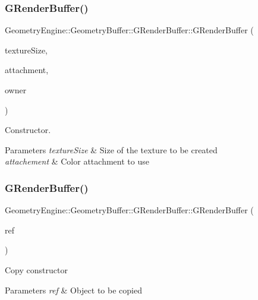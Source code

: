 \subsubsection{\texorpdfstring{GRenderBuffer()}{GRenderBuffer()}\hspace{0.1cm}{\footnotesize\ttfamily [2/3]}}
{\footnotesize\ttfamily Geometry\+Engine\+::\+Geometry\+Buffer\+::\+G\+Render\+Buffer\+::\+G\+Render\+Buffer (\begin{DoxyParamCaption}\item[{const Q\+Vector2D \&}]{texture\+Size,  }\item[{G\+Framebuffer\+Commons\+::\+G\+\_\+\+C\+O\+L\+O\+R\+\_\+\+A\+T\+T\+A\+C\+H\+M\+E\+N\+TS}]{attachment,  }\item[{const \mbox{\hyperlink{class_geometry_engine_1_1_geometry_buffer_1_1_g_framebuffer_object}{G\+Framebuffer\+Object}} $\ast$}]{owner }\end{DoxyParamCaption})}

Constructor. 
\begin{DoxyParams}{Parameters}
{\em texture\+Size} & Size of the texture to be created \\
\hline
{\em attachement} & Color attachment to use \\
\hline
\end{DoxyParams}
\mbox{\label{class_geometry_engine_1_1_geometry_buffer_1_1_g_render_buffer_ac2ea09ec4bd5f76a51f33978196aa6f8}} 
\subsubsection{\texorpdfstring{GRenderBuffer()}{GRenderBuffer()}\hspace{0.1cm}{\footnotesize\ttfamily [3/3]}}
{\footnotesize\ttfamily Geometry\+Engine\+::\+Geometry\+Buffer\+::\+G\+Render\+Buffer\+::\+G\+Render\+Buffer (\begin{DoxyParamCaption}\item[{const \mbox{\hyperlink{class_geometry_engine_1_1_geometry_buffer_1_1_g_render_buffer}{G\+Render\+Buffer}} \&}]{ref }\end{DoxyParamCaption})}

Copy constructor 
\begin{DoxyParams}{Parameters}
{\em ref} & Object to be copied \\
\hline
\end{DoxyParams}


